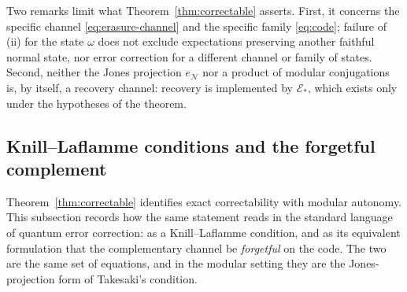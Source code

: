 \documentclass[a4paper,11pt]{article}
\theoremstyle{definition}
\newcommand{\mN}{\mathcal{N}}
\newcommand{\mE}{\mathcal{E}}
\begin{document}
Two remarks limit what Theorem~\ref{thm:correctable} asserts. First, it concerns the specific channel \eqref{eq:erasure-channel} and the specific family \eqref{eq:code}; failure of (ii) for the state $\omega$ does not exclude expectations preserving another faithful normal state, nor error correction for a different channel or family of states. Second, neither the Jones projection $e_{\mN}$ nor a product of modular conjugations is, by itself, a recovery channel: recovery is implemented by $\mE_*$, which exists only under the hypotheses of the theorem.



\subsection{Knill--Laflamme conditions and the forgetful complement}\label{subsec:QEC-KL}

Theorem~\ref{thm:correctable} identifies exact correctability with modular autonomy. This subsection records how the same statement reads in the standard language of quantum error correction: as a Knill--Laflamme condition, and as its equivalent formulation that the complementary channel be \emph{forgetful} on the code. The two are the same set of equations, and in the modular setting they are the Jones-projection form of Takesaki's condition.
\end{document}
